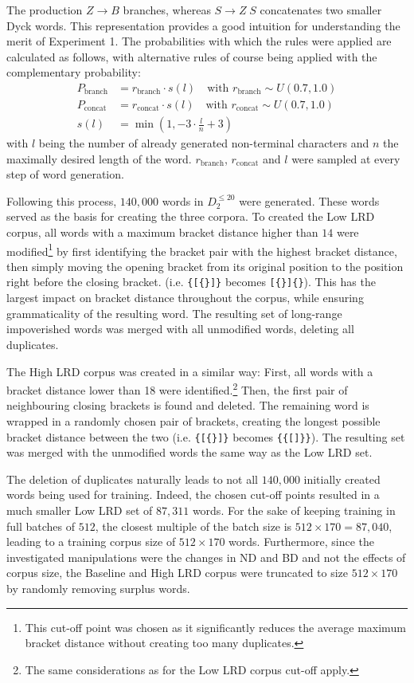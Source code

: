 The production $Z \rightarrow B$ branches, whereas $S \rightarrow Z \; S$ concatenates two smaller Dyck words. This representation provides a good intuition for understanding the merit of Experiment 1. The probabilities with which the rules were applied are calculated as follows, with alternative rules of course being applied with the complementary probability:
\begin{align*}
	P_{\text{branch}} &= r_{\text{branch}} \cdot s(l) \quad \text{with } r_{\text{branch}} \sim U(0.7,1.0) \\
	P_{\text{concat}} &= r_{\text{concat}} \cdot s(l) \quad \text{with } r_{\text{concat}} \sim U(0.7,1.0) \\
	s(l) &= \min(1, -3 \cdot \frac{l}{n} + 3)
\end{align*}
with $l$ being the number of already generated non-terminal characters and $n$ the maximally desired length of the word. $r_{\text{branch}}$, $r_{\text{concat}}$ and $l$ were sampled at every step of word generation.

Following this process, $140,000$ words in $D_{2}^{\leq 20}$ were generated. These words served as the basis for creating the three corpora. To created the Low LRD corpus, all words with a maximum bracket distance higher than $14$ were modified\footnote{This cut-off point was chosen as it significantly reduces the average maximum bracket distance without creating too many duplicates.} by first identifying the bracket pair with the highest bracket distance, then simply moving the opening bracket from its original position to the position right before the closing bracket. (i.e. \texttt{\{[\{\}]\}} becomes \texttt{[\{\}]\{\}}). This has the largest impact on bracket distance throughout the corpus, while ensuring grammaticality of the resulting word. The resulting set of long-range impoverished words was merged with all unmodified words, deleting all duplicates.

The High LRD corpus was created in a similar way: First, all words with a bracket distance lower than 18 were identified.\footnote{The same considerations as for the Low LRD corpus cut-off apply.} Then, the first pair of neighbouring closing brackets is found and deleted. The remaining word is wrapped in a randomly chosen pair of brackets, creating the longest possible bracket distance between the two (i.e. \texttt{\{[\{\}]\}} becomes \texttt{\{\{[]\}\}}). The resulting set was merged with the unmodified words the same way as the Low LRD set.

The deletion of duplicates naturally leads to not all $140,000$ initially created words being used for training. Indeed, the chosen cut-off points resulted in a much smaller Low LRD set of $87,311$ words. For the sake of keeping training in full batches of $512$, the closest multiple of the batch size is $512 \times 170 = 87,040$, leading to a training corpus size of $512 \times 170$ words. Furthermore, since the investigated manipulations were the changes in ND and BD and not the effects of corpus size, the Baseline and High LRD corpus were truncated to size $512 \times 170$ by randomly removing surplus words.

